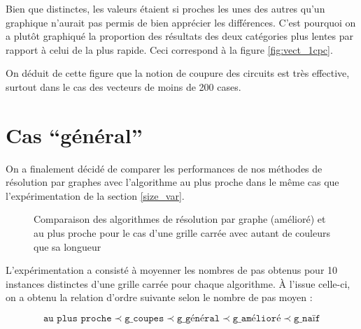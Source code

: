 \documentclass[12pt,a4paper]{article}
\begin{document}
Bien que distinctes, les valeurs \'etaient si proches les unes des autres qu'un 
graphique n'aurait pas permis de bien appr\'ecier les diff\'erences. C'est 
pourquoi on a plut\^ot graphiqu\'e la proportion des r\'esultats des deux 
cat\'egories plus lentes par rapport \`a celui de la plus rapide. Ceci 
correspond \`a la figure \ref{fig:vect_1cpc}.

On d\'eduit de cette figure que la notion de coupure des circuits est tr\`es 
effective, surtout dans le cas des vecteurs de moins de 200 cases.

\section{Cas \enquote{g\'en\'eral}}
On a finalement d\'ecid\'e de comparer les performances de nos m\'ethodes de 
r\'esolution par graphes avec l'algorithme au plus proche dans le m\^eme cas 
que l'exp\'erimentation de la section \ref{size_var}.

\begin{figure}[!h]
  \centering
  \captionsetup{justification=centering}
  \caption[Le cas \enquote{g\'en\'eral}]{Comparaison des algorithmes 
	de r\'esolution par graphe (am\'elior\'e) et au plus proche pour le 
cas d'une grille carr\'ee avec autant de couleurs que sa longueur}
  \label{fig:gene}
\end{figure}

L'exp\'erimentation a consist\'e \`a moyenner les nombres de pas obtenus 
pour 10 instances distinctes d'une grille carr\'ee pour chaque algorithme.
\`A l'issue celle-ci, on a obtenu la relation d'ordre suivante selon le 
nombre de pas moyen :

\begin{equation*}
  \texttt{au plus proche} \prec \texttt{g\_coupes} \prec 
\texttt{g\_g\'en\'eral}   \prec \texttt{g\_am\'elior\'e} \prec 
\texttt{g\_na\"if}
\end{equation*}
\end{document}
